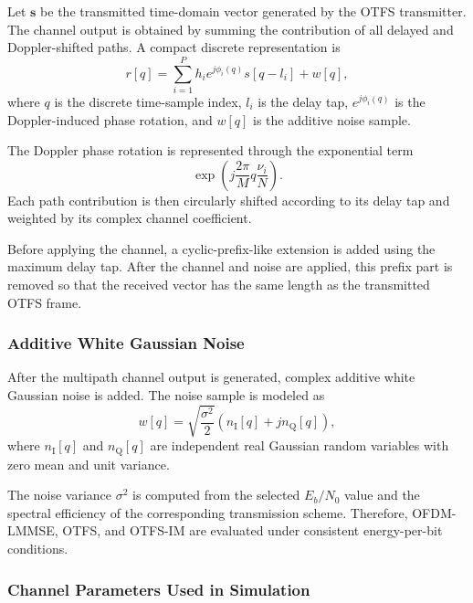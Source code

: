 Let \(\mathbf{s}\) be the transmitted time-domain vector generated by the OTFS transmitter. The channel output is obtained by summing the contribution of all delayed and Doppler-shifted paths. A compact discrete representation is
\begin{equation}
    r[q]
    =
    \sum_{i=1}^{P}
    h_i
    e^{j\phi_i(q)}
    s[q-l_i]
    +
    w[q],
    \label{eq:discrete_channel}
\end{equation}
where \(q\) is the discrete time-sample index, \(l_i\) is the delay tap, \(e^{j\phi_i(q)}\) is the Doppler-induced phase rotation, and \(w[q]\) is the additive noise sample.

The Doppler phase rotation is represented through the exponential term
\begin{equation}
    \exp
    \left(
    j\frac{2\pi}{M}
    q
    \frac{\nu_i}{N}
    \right).
\end{equation}
Each path contribution is then circularly shifted according to its delay tap and weighted by its complex channel coefficient.

Before applying the channel, a cyclic-prefix-like extension is added using the maximum delay tap. After the channel and noise are applied, this prefix part is removed so that the received vector has the same length as the transmitted OTFS frame.

\subsubsection{Additive White Gaussian Noise}

After the multipath channel output is generated, complex additive white Gaussian noise is added. The noise sample is modeled as
\begin{equation}
    w[q]
    =
    \sqrt{\frac{\sigma^2}{2}}
    \left(
    n_{\mathrm{I}}[q] + jn_{\mathrm{Q}}[q]
    \right),
    \label{eq:awgn}
\end{equation}
where \(n_{\mathrm{I}}[q]\) and \(n_{\mathrm{Q}}[q]\) are independent real Gaussian random variables with zero mean and unit variance.

The noise variance \(\sigma^2\) is computed from the selected \(E_b/N_0\) value and the spectral efficiency of the corresponding transmission scheme. Therefore, OFDM-LMMSE, OTFS, and OTFS-IM are evaluated under consistent energy-per-bit conditions.

\subsubsection{Channel Parameters Used in Simulation}

